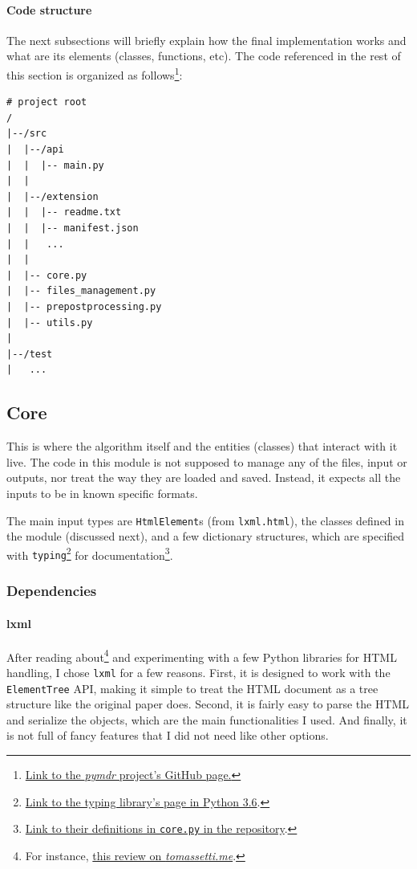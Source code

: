 \documentclass[10pt]{article}
\newcommand{\code}[1]{\colorbox{codegray}{\texttt{#1}}}
\begin{document}

\paragraph{Code structure} The next subsections will briefly explain how the final implementation works and what are its elements (classes, functions, etc). The code referenced in the rest of this section is organized as follows\footnote{\href{https://github.com/joaopcbertoldo/pymdr}{Link to the \emph{pymdr} project's GitHub page.}}:

\begin{lstlisting}[caption=Main code structure]
# project root
/  
|--/src
|  |--/api
|  |  |-- main.py
|  |  
|  |--/extension
|  |  |-- readme.txt
|  |  |-- manifest.json
|  |   ...
|  |
|  |-- core.py
|  |-- files_management.py
|  |-- prepostprocessing.py 
|  |-- utils.py
|
|--/test 
|   ...
\end{lstlisting}



\subsection{Core}

This is where the algorithm itself and the entities (classes) that interact with it live. The code in this module is not supposed to manage any of the files, input or outputs, nor treat the way they are loaded and saved. Instead, it expects all the inputs to be in known specific formats.

The main input types are \code{HtmlElement}s (from \code{lxml.html}), the classes defined in the module (discussed next), and a few dictionary structures, which are specified with \code{typing}\footnote{\href{https://docs.python.org/3.6/library/typing.html}{Link to the typing library's page in Python 3.6}.} for documentation\footnote{\href{https://github.com/joaopcbertoldo/pymdr/blob/7ff7f7653feff23704b6b786db8499188ba378af/src/core.py\#L273}{Link to their definitions in \code{core.py} in the repository}.}.



\subsubsection{Dependencies}

\paragraph{lxml} After reading about\footnote{For instance,   \href{https://tomassetti.me/parsing-html/\#python}{this review on \emph{tomassetti.me}}.} and experimenting with a few Python libraries for HTML handling, I chose \code{lxml} for a few reasons. First, it is designed to work with the \code{ElementTree} API, making it simple to treat the HTML document as a tree structure like the original paper does. Second, it is fairly easy to parse the HTML and serialize the objects, which are the main functionalities I used. And finally, it is not full of fancy features that I did not need like other options.
\end{document}
